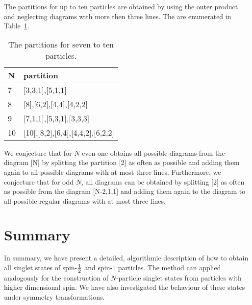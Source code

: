 \documentclass[pra,amsfonts,showpacs,preprint,showkeys]{revtex4}
\begin{document}
The partitions for up to ten particles are obtained
by using the outer product and neglecting diagrams with more then three
lines. The are enumerated in Table~\ref{pfsttp}.
\begin{table}
\begin{tabular}{ll}
\hline\hline
N \qquad \qquad &partition \\
\hline
 7& [3,3,1],[5,1,1]\\
 8& [8],[6,2],[4,4],[4,2,2] \\
 9& [7,1,1],[5,3,1],[3,3,3]\\
10& [10],[8,2],[6,4],[4,4,2],[6,2,2] \\
\hline\hline
\end{tabular}
\caption{The partitions for seven to ten particles.\label{pfsttp}}
\end{table}

We conjecture that for $N$ even one
obtains all possible diagrams from the diagram [N] by splitting
the partition [2] as often
as possible and adding them again to all possible diagrams with at most three lines.
Furthermore, we conjecture that for odd $N$, all diagrams can be obtained by splitting [2] as often as
possible from the diagram [N-2,1,1] and adding them again to the
diagram to all possible regular diagrams with at most three lines.




\section{Summary}

In summary, we have present a detailed, algorithmic description of
how to obtain all singlet states of spin-${1\over 2}$ and spin-$1$ particles.
The method can applied analogously for the construction of $N$-particle singlet states from
particles with
higher dimensional spin.
We have also investigated the behaviour of these states under symmetry transformations.



%
%
\end{document}
